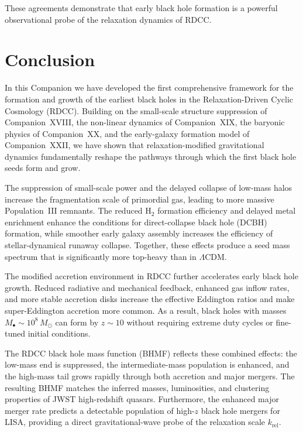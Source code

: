\documentclass[11pt,a4paper]{article}
\begin{document}
These agreements demonstrate that early black hole formation is a powerful observational 
probe of the relaxation dynamics of RDCC.

\section{Conclusion}

In this Companion we have developed the first comprehensive framework for the formation and 
growth of the earliest black holes in the Relaxation-Driven Cyclic Cosmology (RDCC). Building 
on the small-scale structure suppression of Companion~XVIII, the non-linear dynamics of 
Companion~XIX, the baryonic physics of Companion~XX, and the early-galaxy formation model of 
Companion~XXII, we have shown that relaxation-modified gravitational dynamics fundamentally 
reshape the pathways through which the first black hole seeds form and grow.

The suppression of small-scale power and the delayed collapse of low-mass halos increase the 
fragmentation scale of primordial gas, leading to more massive Population~III remnants. The 
reduced $\mathrm{H}_2$ formation efficiency and delayed metal enrichment enhance the 
conditions for direct-collapse black hole (DCBH) formation, while smoother early galaxy 
assembly increases the efficiency of stellar-dynamical runaway collapse. Together, these 
effects produce a seed mass spectrum that is significantly more top-heavy than in 
$\Lambda$CDM.

The modified accretion environment in RDCC further accelerates early black hole growth. 
Reduced radiative and mechanical feedback, enhanced gas inflow rates, and more stable 
accretion disks increase the effective Eddington ratios and make super-Eddington accretion 
more common. As a result, black holes with masses 
$M_{\bullet} \sim 10^{8}\,M_{\odot}$ can form by $z \sim 10$ without requiring extreme duty 
cycles or fine-tuned initial conditions.

The RDCC black hole mass function (BHMF) reflects these combined effects: the low-mass end is 
suppressed, the intermediate-mass population is enhanced, and the high-mass tail grows rapidly 
through both accretion and major mergers. The resulting BHMF matches the inferred masses, 
luminosities, and clustering properties of JWST high-redshift quasars. Furthermore, the 
enhanced major merger rate predicts a detectable population of high-$z$ black hole mergers for 
LISA, providing a direct gravitational-wave probe of the relaxation scale $k_{\mathrm{rel}}$.
\end{document}
